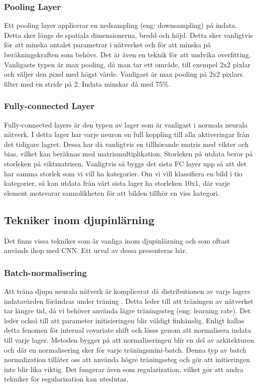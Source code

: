 \documentclass[]{kththesis}
\begin{document}
\subsubsection{Pooling Layer}
Ett pooling layer applicerar en nedsampling (eng: downsampling) på indata. Detta sker längs de spatiala dimensionerna, bredd och höjd. Detta sker vanligtvis för att minska antalet parametrar i nätverket och för att minska på beräkningskraften som behövs. Det är även en teknik för att undvika overfitting. Vanligaste typen är max pooling, då man tar ett område, till exempel 2x2 pixlar och väljer den pixel med högst värde. Vanligast är max pooling på 2x2 pixlars filter med en stride på 2. Indata minskar då med 75\%.

\subsubsection{Fully-connected Layer}
Fully-connected layers är den typen av lager som är vanligast i normala neurala nätverk. I detta lager har varje neuron en full koppling till alla aktiveringar från det tidigare lagret. Dessa har då vanligtvis en tillhörande matris med vikter och bias, vilket kan beräknas med matrismultiplikation. Storleken på utdata beror på storleken på viktmatrisen. Vanligtvis så byggs det sista FC layer upp så att det har samma storlek som vi vill ha kategorier. Om vi vill klassifiera en bild i tio kategorier, så kan utdata från vårt sista lager ha storleken 10x1, där varje element motsvarar sannolikheten för att bilden tillhör en viss kategori.

\subsection{Tekniker inom djupinlärning}
Det finns vissa tekniker som är vanliga inom djupinlärning och som oftast används ihop med CNN. Ett urval av dessa presenteras här.

\subsubsection{Batch-normalisering}
Att träna djupa neurala nätverk är komplicerat då distributionen av varje lagers indatavärden förändras under träning \parencite{ioffe2015batch}. Detta leder till att träningen av nätverket tar längre tid, då vi behöver använda lägre träningssteg (eng: learning rate). Det leder också till att parameter initisieringen blir väldigt finkänslig. Enligt \cite{ioffe2015batch} kallas detta fenomen för internal covariate shift och löses genom att normalisera indata till varje lager. Metoden bygger på att normaliseringen blir en del av arkitekturen och där en normalisering sker för varje träningsmini-batch. Denna typ av batch normalization tillåter oss att använda högre träningssteg och gör att initieringen inte blir lika viktig. Det fungerar även som regularization, vilket gör att andra tekniker för regularization kan uteslutas.
\end{document}
